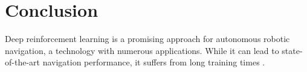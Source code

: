 \chapter{Conclusion}
Deep reinforcement learning is a promising approach for autonomous robotic navigation, a technology with numerous applications. While it can lead to state-of-the-art navigation performance, it suffers from long training times \citep{kastner}.
